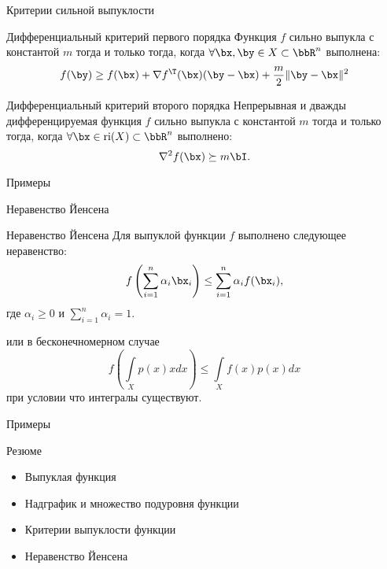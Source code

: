 \documentclass[12pt,russian]{beamer}
\begin{document}
\begin{frame}{Критерии сильной выпуклости}

\begin{block}{Дифференциальный критерий первого порядка}
Функция $f$ сильно выпукла с константой $m$ тогда и только тогда, когда $\forall \bx, \by \in X \subset \bbR^n$ выполнена:
\vspace{-4mm}
\[
f(\by) \geq f(\bx) + \nabla f^{\T}(\bx)(\by - \bx) + \frac{m}{2}\| \by - \bx \|^2
\]
\end{block}

\begin{block}{Дифференциальный критерий второго порядка}
Непрерывная и дважды дифференцируемая функция $f$ сильно выпукла с константой $m$ тогда и только тогда, когда $\forall \bx \in \text{ri}(X) \subset \bbR^n$ выполнено:
\vspace{-2mm}
\[
\nabla^2 f(\bx) \succeq m\bI.
\]
\end{block}
\end{frame}

\begin{frame}{Примеры}

\end{frame}

\begin{frame}{Неравенство Йенсена}
 
\begin{block}{Неравенство Йенсена}
Для выпуклой функции $f$ выполнено следующее неравенство:
\vspace{-4mm}
\[
f\left( \sum\limits_{i=1}^n \alpha_i \bx_i \right) \leq \sum\limits_{i=1}^n \alpha_i f(\bx_i),
\vspace{-4mm}
\] 
где $\alpha_i \geq 0$ и $\sum\limits_{i=1}^n \alpha_i = 1$.
\end{block}

или в бесконечномерном случае 
\[
f\left( \int\limits_X p(x)xdx \right) \leq \int\limits_X f(x)p(x)dx
\]
при условии что интегралы существуют.

\end{frame}

\begin{frame}{Примеры}

\end{frame}

\begin{frame}{Резюме}
\begin{itemize}
\item Выпуклая функция
\item Надграфик и множество подуровня функции
\item Критерии выпуклости функции
\item Неравенство Йенсена
\end{itemize}
\end{frame}
\end{document}
